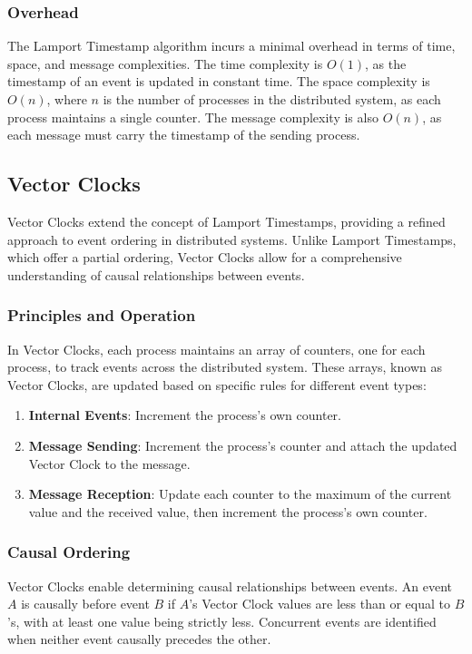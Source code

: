 \documentclass{article}
\begin{document}
  \subsubsection{Overhead}
    The Lamport Timestamp algorithm incurs a minimal overhead in terms of time, space, and message complexities. The time complexity is $O(1)$, as the timestamp of an event is updated in constant time. The space complexity is $O(n)$, where $n$ is the number of processes in the distributed system, as each process maintains a single counter. The message complexity is also $O(n)$, as each message must carry the timestamp of the sending process.

  \subsection{Vector Clocks}
    Vector Clocks extend the concept of Lamport Timestamps, providing a refined approach to event ordering in distributed systems. Unlike Lamport Timestamps, which offer a partial ordering, Vector Clocks allow for a comprehensive understanding of causal relationships between events.

    \subsubsection{Principles and Operation}\label{sec:vector_clocks}
    In Vector Clocks, each process maintains an array of counters, one for each process, to track events across the distributed system. These arrays, known as Vector Clocks, are updated based on specific rules for different event types:
    \begin{enumerate}
    \item \textbf{Internal Events}: Increment the process's own counter.
    \item \textbf{Message Sending}: Increment the process's counter and attach the updated Vector Clock to the message.
    \item \textbf{Message Reception}: Update each counter to the maximum of the current value and the received value, then increment the process's own counter.
    \end{enumerate}
    
    \subsubsection{Causal Ordering}
    Vector Clocks enable determining causal relationships between events. An event $A$ is causally before event $B$ if $A$'s Vector Clock values are less than or equal to $B$'s, with at least one value being strictly less. Concurrent events are identified when neither event causally precedes the other.
\end{document}
